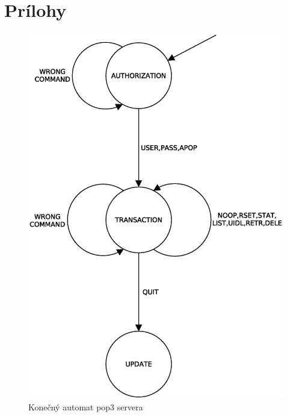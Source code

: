 \documentclass[11pt,a4paper]{article}
\begin{document}
\newpage %

\section{Prílohy}

\begin{figure}[h]
	\center
    \includegraphics[scale=0.5]{images/FSM}
    \caption{Konečný automat pop3 servera}
	\label{IMG-FSM}
\end{figure}

\newpage %

\makeatletter
\makeatother

\begin{flushleft}
	
\end{flushleft}
\end{document}
